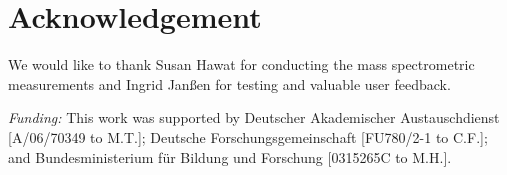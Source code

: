 \documentclass{bioinfo}
\begin{document}


\section*{Acknowledgement}

We would like to thank Susan Hawat for conducting the mass spectrometric 
measurements and Ingrid Jan{\ss}en for testing and valuable user feedback.

{\em Funding:} 
This work was supported by
Deutscher \mbox{Akademischer} Austauschdienst [A/06/70349 to M.T.]; 
Deutsche Forschungsgemeinschaft [FU780/2-1 to C.F.]; 
and Bundesministerium f\"ur Bildung und Forschung [0315265C to M.H.].



\end{document}

